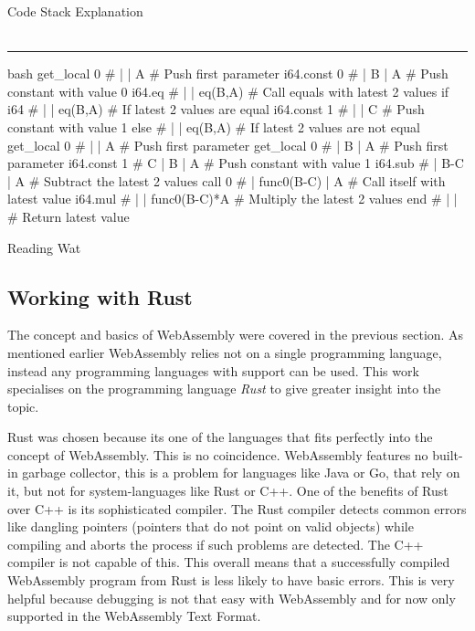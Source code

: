 \begin{listing}
\hspace{1cm} Code \hspace{3cm} Stack \hspace{4cm} Explanation \vspace{-0.5cm} \\\\
\noindent\rule{\textwidth}{0.6pt} \vspace{-0.5cm}
\begin{code}[]{bash}
get_local 0      #   |            | A            # Push first parameter         
i64.const 0      #   | B          | A            # Push constant with value 0
i64.eq           #   |            | eq(B,A)      # Call equals with latest 2 values
if i64           #   |            | eq(B,A)      # If latest 2 values are equal
    i64.const 1  #   |            | C            # Push constant with value 1
else             #   |            | eq(B,A)      # If latest 2 values are not equal
    get_local 0  #   |            | A            # Push first parameter
    get_local 0  #   | B          | A            # Push first parameter
    i64.const 1  # C | B          | A            # Push constant with value 1
    i64.sub      #   | B-C        | A            # Subtract the latest 2 values
    call 0       #   | func0(B-C) | A            # Call itself with latest value
    i64.mul      #   |            | func0(B-C)*A # Multiply the latest 2 values
end              #   |            |              # Return latest value
\end{code}
\caption{Reading Wat}
\label{lst:wat-code}
\end{listing}

\label{sec:rust}
\subsection{Working with Rust}
The concept and basics of WebAssembly were covered in the previous section. As mentioned earlier WebAssembly relies not on a single programming language, instead any programming languages with support can be used.
This work specialises on the programming language \textit{Rust} to give greater insight into the topic. 

Rust was chosen because its one of the languages that fits perfectly into the concept of WebAssembly. This is no coincidence. WebAssembly features no built-in garbage collector, this is a problem for languages like Java or Go, that rely on it, but not for system-languages like Rust or C++. One of the benefits of Rust over C++ is its sophisticated compiler. The Rust compiler detects common errors like dangling \glspl{pointer} (pointers that do not point on valid objects) while compiling and aborts the process if such problems are detected. The C++ compiler is not capable of this. This overall means that a successfully compiled WebAssembly program from Rust is less likely to have basic errors. This is very helpful because debugging is not that easy with WebAssembly and for now only supported in the WebAssembly Text Format.

